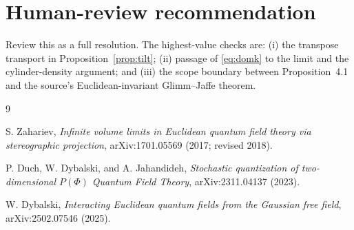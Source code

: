 \documentclass[11pt]{article}
\begin{document}
\section{Human-review recommendation}

Review this as a full resolution.  The highest-value checks are: (i) the
transpose transport in Proposition~\ref{prop:tilt}; (ii) passage of
\eqref{eq:domk} to the limit and the cylinder-density argument; and (iii) the
scope boundary between Proposition~4.1 and the source's Euclidean-invariant
Glimm--Jaffe theorem.

\begin{thebibliography}{9}
\raggedright
\enlargethispage{4\baselineskip}

S. Zahariev,
\emph{Infinite volume limits in Euclidean quantum field theory via
stereographic projection},
arXiv:1701.05569 (2017; revised 2018).

P. Duch, W. Dybalski, and A. Jahandideh,
\emph{Stochastic quantization of two-dimensional $P(\Phi)$ Quantum Field
Theory},
arXiv:2311.04137 (2023).

W. Dybalski,
\emph{Interacting Euclidean quantum fields from the Gaussian free field},
arXiv:2502.07546 (2025).

\end{thebibliography}
\end{document}

